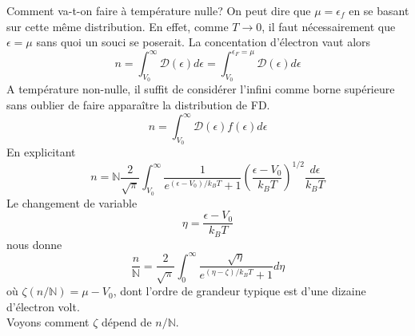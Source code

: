 Comment va-t-on faire à température nulle? On peut dire que 
$\mu = \epsilon_f$ en se basant sur cette même distribution. En 
effet, comme $T\rightarrow 0$, il faut nécessairement que $\epsilon
= \mu$ sans quoi un souci se poserait. La concentation d'électron 
vaut alors
\begin{equation}
	n = \int_{V_0}^\infty \mathcal{D}(\epsilon)d\epsilon = 
	\int_{V_0}^{\epsilon_F=\mu}\mathcal{D}(\epsilon)d\epsilon 
\end{equation}
A température non-nulle, il suffit de considérer l'infini comme borne 
supérieure sans oublier de faire apparaître la distribution de FD.
\begin{equation}
	n = \int_{V_0}^\infty \mathcal{D}(\epsilon)f(\epsilon)d\epsilon
\end{equation}
En explicitant
\begin{equation}
	n = \mathbb{N}\frac{2}{\sqrt{\pi}}\int_{V_0}^\infty \frac{1}{e^{
		(\epsilon-V_0)/k_BT}+1}\left(\frac{\epsilon-V_0}{k_BT}\right)^{1/2
	}\frac{d\epsilon}{k_BT}
\end{equation}
Le changement de variable
\begin{equation}
	\eta = \frac{\epsilon - V_0}{k_BT}
\end{equation}
nous donne
\begin{equation}
	\frac{n}{\mathbb{N}} = \frac{2}{\sqrt{\pi}}\int_0^\infty \dfrac{\sqrt
		{\eta}}{e^{(\eta-\zeta)/k_BT}+1}d\eta
\end{equation}
où $\zeta(n/\mathbb{N}) = \mu - V_0$, dont l'ordre de grandeur typique 
est 
d'une dizaine d'électron volt.\\
Voyons comment $\zeta$ dépend de $n/\mathbb{N}$.
